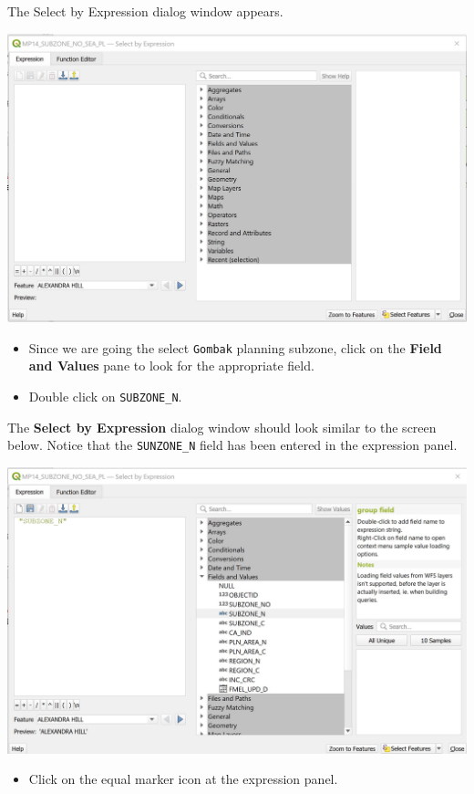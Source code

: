 \documentclass[
  letterpaper,
  DIV=11,
  numbers=noendperiod]{scrreprt}
\providecommand{\tightlist}{%
  \setlength{\itemsep}{0pt}\setlength{\parskip}{0pt}}\usepackage{longtable,booktabs,array}
\begin{document}
The Select by Expression dialog window appears.

\includegraphics{./img07/image3.jpg}

\begin{itemize}
\tightlist
\item
  Since we are going the select \texttt{Gombak} planning subzone, click
  on the \textbf{Field and Values} pane to look for the appropriate
  field.
\item
  Double click on \texttt{SUBZONE\_N}.
\end{itemize}

The \textbf{Select by Expression} dialog window should look similar to
the screen below. Notice that the \texttt{SUNZONE\_N} field has been
entered in the expression panel.

\includegraphics{./img07/image4.jpg}

\begin{itemize}
\tightlist
\item
  Click on the equal marker icon at the expression panel.
\end{itemize}
\end{document}
